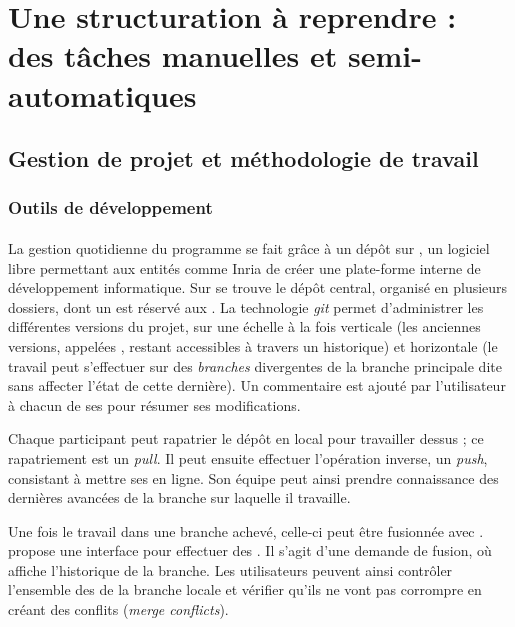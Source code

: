 \part{Une structuration à reprendre : des tâches manuelles et semi-automatiques}

\clearpage
\thispagestyle{empty}
\cleardoublepage

\chapter{Gestion de projet et méthodologie de travail}


\section{Outils de développement}

\subsection{\gitlab}

La gestion quotidienne du programme \timeus{} se fait grâce à un dépôt sur \gitlab{}, un logiciel libre permettant aux entités comme Inria de créer une plate-forme interne de développement informatique. Sur \gitlab{} se trouve le dépôt central, organisé en plusieurs dossiers, dont un est réservé aux \odm. La technologie \textit{git} permet d'administrer les différentes versions du projet, sur une échelle à la fois verticale (les anciennes versions, appelées \commits, restant accessibles à travers un historique) et horizontale (le travail peut s'effectuer sur des \textit{branches} divergentes de la branche principale dite \master{} sans affecter l'état de cette dernière). Un commentaire est ajouté par l'utilisateur à chacun de ses \commits{} pour résumer ses modifications.

Chaque participant peut rapatrier le dépôt \gitlab{} en local pour travailler dessus ; ce rapatriement est un \textit{pull}. Il peut ensuite effectuer l'opération inverse, un \textit{push}, consistant à mettre ses \commits{} en ligne. Son équipe peut ainsi prendre connaissance des dernières avancées de la branche sur laquelle il travaille.

Une fois le travail dans une branche achevé, celle-ci peut être fusionnée avec \master. \gitlab{} propose une interface pour effectuer des \mergerequests{}. Il s'agit d'une demande de fusion, où \gitlab{} affiche l'historique de la branche. Les utilisateurs peuvent ainsi contrôler l'ensemble des \commits{} de la branche locale et vérifier qu'ils ne vont pas corrompre \master{} en créant des conflits (\textit{merge conflicts}).

